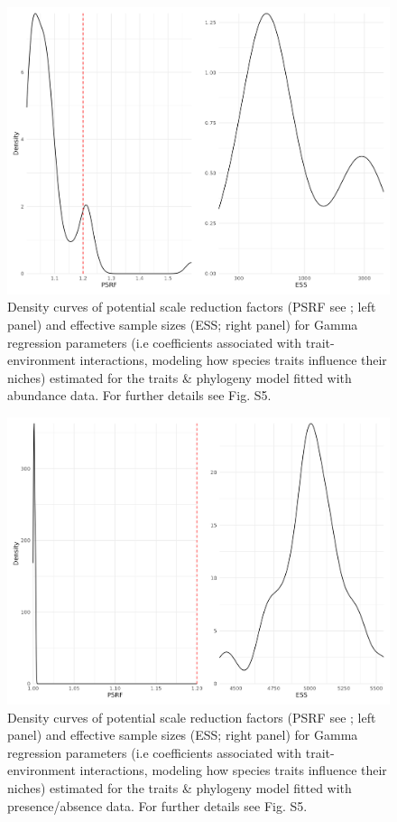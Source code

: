 \begin{figure}
\hypertarget{fig:chapt1phylo_traits_ab_gamma}{%
\centering
\includegraphics{03-Chapitre1/figures/supplementary/fig_supp_conv_gamma_PolychaetaPhylogenyTraitsAB.png}
\caption{Density curves of potential scale reduction factors (PSRF see
\textcite{Brooks_1998}; left panel) and effective sample sizes (ESS;
right panel) for Gamma regression parameters (i.e coefficients
associated with trait-environment interactions, modeling how species
traits influence their niches) estimated for the traits \& phylogeny
model fitted with abundance data. For further details see Fig.
S5.}\label{fig:chapt1phylo_traits_ab_gamma}
}
\end{figure}

\begin{figure}
\hypertarget{fig:chapt1phylo_traits_pa_gamma}{%
\centering
\includegraphics{03-Chapitre1/figures/supplementary/fig_supp_conv_gamma_PolychaetaPhylogenyTraitsPA.png}
\caption{Density curves of potential scale reduction factors (PSRF see
\textcite{Brooks_1998}; left panel) and effective sample sizes (ESS;
right panel) for Gamma regression parameters (i.e coefficients
associated with trait-environment interactions, modeling how species
traits influence their niches) estimated for the traits \& phylogeny
model fitted with presence/absence data. For further details see Fig.
S5.}\label{fig:chapt1phylo_traits_pa_gamma}
}
\end{figure}

